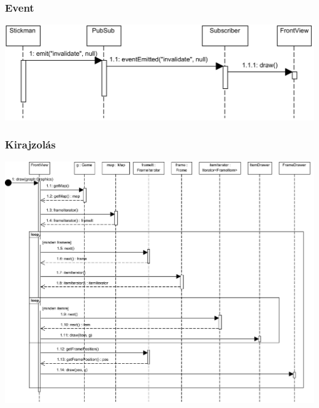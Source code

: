 		\subsubsection{Event}
		    \begin{center}
			    \includegraphics[scale=0.88]{resources/event.png}
		    \end{center}

		\subsubsection{Kirajzolás}
		    \begin{center}
			    \includegraphics[scale=0.95, angle=-90]{resources/drawing.png}
		    \end{center}
	
